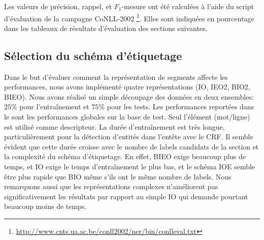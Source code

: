 Les valeurs de précision, rappel, et $F_1$-mesure ont été calculées à l'aide du script d'évaluation de la campagne CoNLL-2002 \footnote{\url{http://www.cnts.ua.ac.be/conll2002/ner/bin/conlleval.txt}}. Elles sont indiquées en pourcentage dans les tableaux de résultats d'évaluation des sections suivantes.

\subsection{Sélection du schéma d'étiquetage}
Dans le but d'évaluer comment la représentation de segments affecte les performances, nous avons implémenté quatre représentations (IO, IEO2, BIO2, BIEO).  Nous avons réalisé un simple découpage des données en deux ensembles: $25 \%$ pour l'entraînement et $75 \%$ pour les tests. Les performances reportées dans le  sont les performances globales sur la base de test. Seul l'élément (mot/ligne) est utilisé comme descripteur. La durée d'entraînement est très longue, particulièrement pour la détection d'entités dans l'entête avec le CRF. Il semble évident que cette durée croisse avec le nombre de labels candidats de la section et la complexité du schéma d'étiquetage. En effet, BIEO exige beaucoup plus de temps, et IO exige le temps d'entraînement le plus bas, et le schéma IOE semble être plus rapide que BIO même s'ils ont le même nombre de labels. Nous remarquons aussi que les représentations complexes n'améliorent pas significativement les résultats par rapport au simple IO qui demande pourtant beaucoup moins de temps.

